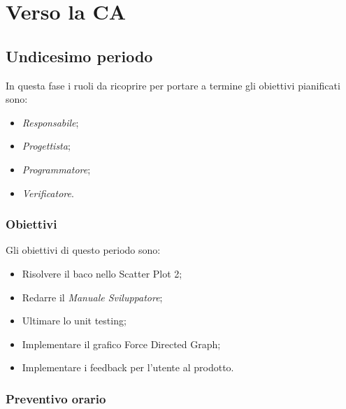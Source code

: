 \newpage
\section{Verso la CA}

\subsection{Undicesimo periodo}

In questa fase i ruoli da ricoprire per portare a termine gli obiettivi pianificati sono:
\begin{itemize}
    \item \textit{Responsabile};
    \item \textit{Progettista};
    \item \textit{Programmatore};
    \item \textit{Verificatore}.
\end{itemize}

\subsubsection{Obiettivi}
Gli obiettivi di questo periodo sono:
\begin{itemize}
    \item Risolvere il baco nello Scatter Plot 2;
    \item Redarre il \textit{Manuale Sviluppatore};
    \item Ultimare lo unit testing;
    \item Implementare il grafico Force Directed Graph;
    \item Implementare i feedback per l'utente al prodotto.

\end{itemize}

\subsubsection{Preventivo orario}

